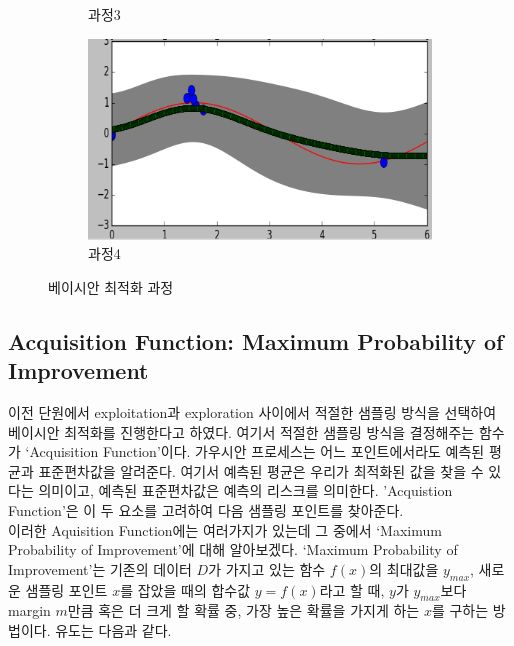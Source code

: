 \documentclass[a4paper]{oblivoir}
\begin{document}
\begin{figure}[ht]
\begin{subfigure}[b]{0.5\textwidth}
     \caption{과정3}
   \end{subfigure}\hspace{0.1cm}
   \begin{subfigure}[b]{0.5\textwidth}
     \includegraphics[width=\textwidth]{fig12_24.png}
     \caption{과정4}
   \end{subfigure}
   \caption{베이시안 최적화 과정}
   \label{fig:12-20}
\end{figure}

\subsection{Acquisition Function: Maximum Probability of Improvement}

이전 단원에서 exploitation과 exploration 사이에서 적절한 샘플링 방식을 선택하여 베이시안 최적화를 진행한다고 하였다. 여기서 적절한 샘플링 방식을 결정해주는 함수가 ‘Acquisition Function’이다. 가우시안 프로세스는 어느 포인트에서라도 예측된 평균과 표준편차값을 알려준다. 여기서 예측된 평균은 우리가 최적화된 값을 찾을 수 있다는 의미이고, 예측된 표준편차값은 예측의 리스크를 의미한다. 'Acquistion Function'은 이 두 요소를 고려하여 다음 샘플링 포인트를 찾아준다.\\

이러한 Aquisition Function에는 여러가지가 있는데 그 중에서 ‘Maximum Probability of Improvement’에 대해 알아보겠다. ‘Maximum Probability of Improvement’는 기존의 데이터 $D$가 가지고 있는 함수 $f(x)$의 최대값을 $y_{max}$, 새로운 샘플링 포인트 $x$를 잡았을 때의 합수값 $y=f(x)$라고 할 때,  $y$가 $y_{max}$보다  margin $m$만큼 혹은 더 크게 할 확률 중, 가장 높은 확률을 가지게 하는 $x$를 구하는 방법이다. 유도는 다음과 같다.
\end{document}
